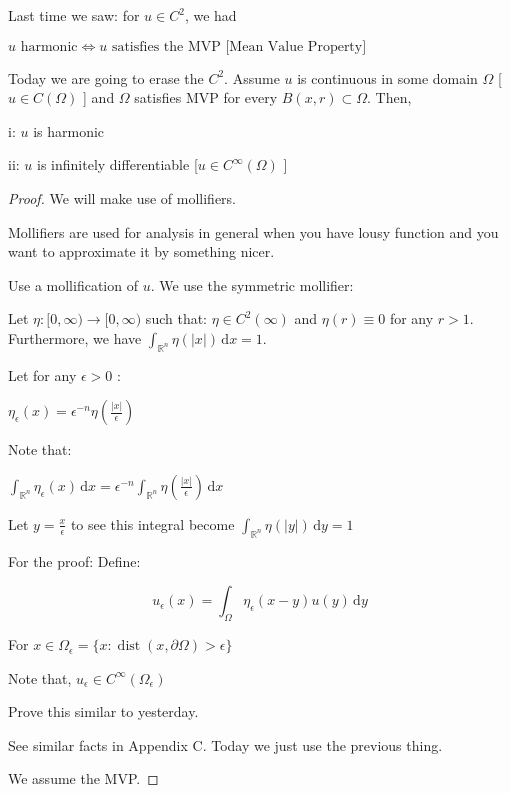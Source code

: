\documentclass{article}
\theoremstyle{definition}
\begin{document}
Last time we saw: for \(u\in C^2\), we had

\(u\text{ harmonic} \iff u\text{ satisfies the MVP [Mean Value Property]}  \) 

Today we are going to erase the \(C^2\). Assume \(u\) is continuous in some domain \(\Omega \) [\(u\in C(\Omega)\) ] and \(\Omega\) satisfies MVP for every \(B(x,r) \subset \Omega\). Then,

i: \(u\) is harmonic

ii: \(u\) is infinitely differentiable [\(u\in C^{\infty} (\Omega) \) ] 

\begin{proof}
    We will make use of mollifiers.

    Mollifiers are used for analysis in general when you have lousy function and you want to approximate it by something nicer.

    Use a mollification of \(u\). We use the symmetric mollifier:

    Let \(\eta : [0,\infty) \to [0,\infty)\) such that: \(\eta \in C^2(\infty)\) and \(\eta(r)\equiv 0\) for any \(r > 1\). Furthermore, we have \(\int_{\mathbb{R}^n}^{} \eta (\vert x \vert ) \,\mathrm{d}x  = 1\).
    
    Let for any \( \epsilon > 0\) :

    \(\eta_{\epsilon} (x)=\epsilon^{-n}\eta \left( \frac{\vert x \vert}{\epsilon} \right) \) 

    Note that:

    \(\int_{\mathbb{R} ^n}^{} \eta _\epsilon (x) \,\mathrm{d}x = \epsilon ^{-n} \int_{\mathbb{R} ^n}^{} \eta \left( \frac{\vert x \vert}{\epsilon} \right)  \,\mathrm{d}x \) 

    Let \(y=\frac{x}{\epsilon}\) to see this integral become \(\int_{\mathbb{R} ^n}^{} \eta (\vert y \vert ) \,\mathrm{d}y = 1\) 

    For the proof: Define:

    \[
        u_{\epsilon} (x) = \int_{\Omega}^{} \eta _\epsilon (x-y)u(y) \,\mathrm{d}y 
    \]

    For \(x\in \Omega_{\epsilon}=\{ x:\operatorname{dist}(x,\partial \Omega) > \epsilon  \}  \) 

    Note that, \(u_{\epsilon} \in C^{\infty} (\Omega _\epsilon)\) 

    Prove this similar to yesterday.

    See similar facts in Appendix C. Today we just use the previous thing.

    We assume the MVP.


\end{proof}
\end{document}
